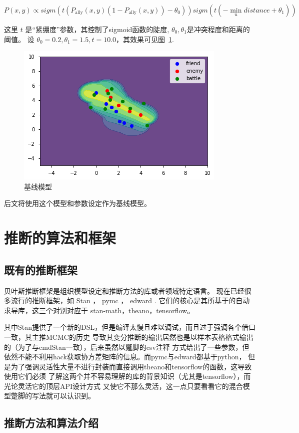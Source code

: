 \documentclass{sicnuthesis}
\begin{document}
$$
P(x,y) \propto sigm(t (P_\text{ally}(x,y) (1-P_\text{ally}(x,y)) - \theta_0)) sigm(t(-\min_{u} distance + \theta_1))
$$


这里 $t$ 是“紧绷度”参数，其控制了sigmoid函数的陡度, $\theta_0,\theta_1$是冲突程度和距离的阈值。
 设 $\theta_0=0.2,\theta_1=1.5,t = 10.0$，其效果可见图~\ref{fig:combSix}.


\begin{figure}[htb]
\includegraphics[width=0.6\linewidth]{comb6.png}
\caption{基线模型}
\label{fig:combSix}
\end{figure}


后文将使用这个模型和参数设定作为基线模型。

\clearpage
\section{推断的算法和框架}


\subsection{既有的推断框架}

贝叶斯推断框架是组织模型设定和推断方法的库或者领域特定语言。
现在已经很多流行的推断框架，如 Stan \cite{carpenter2017stan}，
pymc\cite{patil2010pymc} ， edward \cite{tran2016edward}. 
它们的核心是其所基于的自动求导库，这三个对别对应于 stan-math，theano，tensorflow。

其中Stan提供了一个新的DSL，但是编译太慢且难以调试，而且过于强调各个借口一致，其主推MCMC的历史
导致其变分推断的输出居然也是以样本表格格式输出的（为了与cmdStan一致），后来虽然以蹩脚的csv注释
方式给出了一些参数，但依然不能不利用hack获取协方差矩阵的信息。而pymc与edward都基于python，
但是为了强调灵活性大量不进行封装而直接调用theano和tensorflow的函数，这导致使用它们必须
了解这两个并不容易理解的库的背景知识（尤其是tensorflow），而光论灵活它的顶层API设计方式
又使它不那么灵活，这一点只要看看它的混合模型蹩脚的写法就可以认识到。

\subsection{推断方法和算法介绍}
\end{document}

